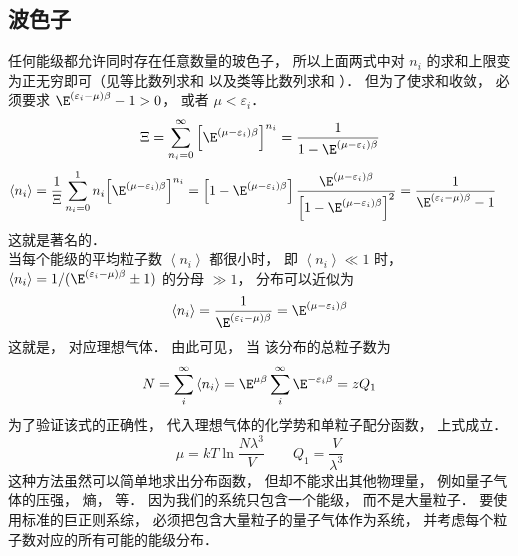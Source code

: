 \subsection{波色子} 
任何能级都允许同时存在任意数量的玻色子， 所以上面两式中对 ${n_i}$ 的求和上限变为正无穷即可（见等比数列求和%
以及类等比数列求和%
）． 但为了使求和收敛， 必须要求 ${\E^{\left( {{\varepsilon_i} - \mu } \right)\beta }} - 1 > 0$，  或者 $\mu  < {\varepsilon_i}$． 
\begin{equation}
  \Xi  = \sum\limits_{{n_i} = 0}^\infty  {{\left[ {\E^{\left( {\mu  - {\varepsilon_i}} \right)\beta }} \right]}^{n_i}}  = \frac{1}{1 - {\E^{\left( {\mu  - {\varepsilon_i}} \right)\beta }}}
\end{equation}
\begin{equation}
\begin{aligned}
  \left\langle {n_i} \right\rangle & = \frac{1}{\Xi }\sum\limits_{{n_i} = 0}^1 {{n_i}{{\left[ {\E^{\left( {\mu  - {\varepsilon_i}} \right)\beta }} \right]}^{n_i}}} = \left[ {1 - {\E^{\left( {\mu  - {\varepsilon_i}} \right)\beta }}} \right]\frac{\E^{\left( {\mu  - {\varepsilon_i}} \right)\beta }}{{\left[ {1 - {\E^{\left( {\mu  - {\varepsilon_i}} \right)\beta }}} \right]}^2}  = \frac{1}{{\E^{\left( {{\varepsilon_i} - \mu } \right)\beta }} - 1}
  \end{aligned}
\end{equation}
这就是著名的．\\
当每个能级的平均粒子数 $\left\langle {n_i} \right\rangle $ 都很小时， 即 $\left\langle {n_i} \right\rangle \ll 1$ 时， $\left\langle {n_i} \right\rangle  = {1}/({{\E^{\left( {{\varepsilon_i} - \mu } \right)\beta }} \pm 1})$ 的分母 $ \gg 1$，  分布可以近似为
\begin{equation}
  \left\langle {n_i} \right\rangle  = \frac{1}{\E^{\left( {{\varepsilon_i} - \mu } \right)\beta }} = {\E^{\left( {\mu  - {\varepsilon_i}} \right)\beta }}
\end{equation}
这就是， 对应理想气体． 由此可见， 当 %
该分布的总粒子数为
\begin{equation}
  N = \sum\limits_i^\infty  {\left\langle {n_i} \right\rangle }  = {\E^{\mu \beta }}\sum\limits_i^\infty  {\E^{ - {\varepsilon_i}\beta }}  = z{Q_1}
\end{equation}
为了验证该式的正确性， 代入理想气体的化学势和单粒子配分函数， 上式成立．
\begin{equation}
  \mu  = kT\ln \frac{N{\lambda ^3}}{V} 
  \qquad
  {Q_1} = \frac{V}{\lambda ^3}
\end{equation}
这种方法虽然可以简单地求出分布函数， 但却不能求出其他物理量， 例如量子气体的压强， 熵， 等． 因为我们的系统只包含一个能级， 而不是大量粒子． 要使用标准的巨正则系综， 必须把包含大量粒子的量子气体作为系统， 并考虑每个粒子数对应的所有可能的能级分布．\\